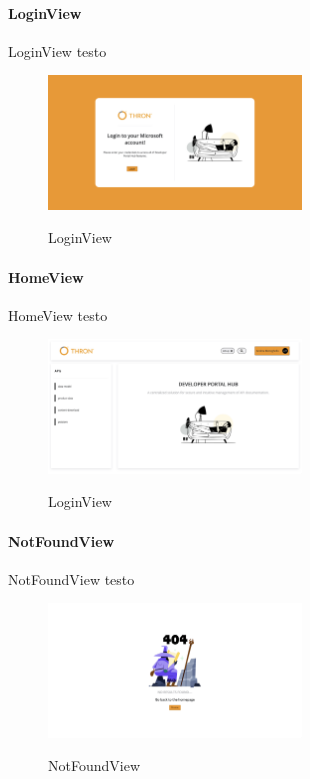 \paragraph{LoginView}\label{par:ogin-view}

LoginView testo

\begin{figure}[ht]
  \centering
  \includegraphics[width=0.6\textwidth, alt={Pagina di login dell'applicazione}]{images/frontend/LoginView.jpg}
  \caption{LoginView}\label{fig:login-view}
\end{figure}

\paragraph{HomeView}\label{par:home-view}

HomeView testo

\begin{figure}[ht]
  \centering
  \includegraphics[width=0.6\textwidth, alt={Pagina principale dell'applicazione}]{images/frontend/HomeView.jpg}
  \caption{LoginView}\label{fig:home-view}
\end{figure}

\paragraph{NotFoundView}\label{par:not-found-view}
NotFoundView testo

\begin{figure}[ht]
  \centering
  \includegraphics[width=0.6\textwidth, alt={Pagina di errore 404}]{images/frontend/NotFoundView.jpg}
  \caption{NotFoundView}\label{fig:not-found-view}
\end{figure}

